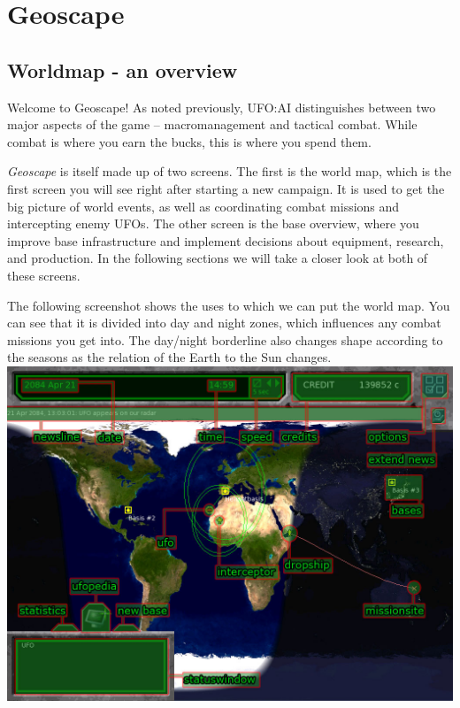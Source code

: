 \section{Geoscape}

\subsection{Worldmap - an overview} 
Welcome to Geoscape! As noted previously, UFO:AI distinguishes between two major aspects of the game -- macromanagement and tactical combat. While combat is where you earn the bucks, this is where you spend them.

\emph{Geoscape} is itself made up of two screens. The first is the world map, which is the first screen you will see right after starting a new campaign. It is used to get the big picture of world events, as well as coordinating combat missions and intercepting enemy UFOs. The other screen is the base overview, where you improve base infrastructure and implement decisions about equipment, research, and production. In the following sections we will take a closer look at both of these screens.

The following screenshot shows the uses to which we can put the world map. You can see that it is divided into day and night zones, which influences any combat missions you get into.  The day/night borderline also changes shape according to the seasons as the relation of the Earth to the Sun changes.\\

\includegraphics[width=\textwidth]{images/geoscape_final.jpg}

